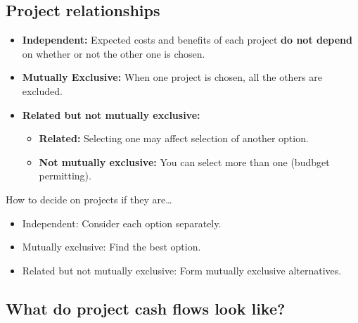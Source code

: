 \subsection{Project relationships}
\begin{definition}
    \begin{itemize}
        \item \textbf{Independent:} Expected costs and benefits of each project \textbf{do not depend} on whether or not the other one is chosen.
        \item \textbf{Mutually Exclusive:} When one project is chosen, all the others are excluded.
        \item \textbf{Related but not mutually exclusive:}
        \begin{itemize}
            \item \textbf{Related:} Selecting one may affect selection of another option.
            \item \textbf{Not mutually exclusive:} You can select more than one (budbget permitting).
        \end{itemize}
    \end{itemize}
\end{definition}

\begin{intuition}
    How to decide on projects if they are\dots
    \begin{itemize}
        \item Independent: Consider each option separately.
        \item Mutually exclusive: Find the best option.
        \item Related but not mutually exclusive: Form mutually exclusive alternatives.
    \end{itemize}
\end{intuition}

\subsection{What do project cash flows look like?}
\begin{intuition}
\end{intuition}

